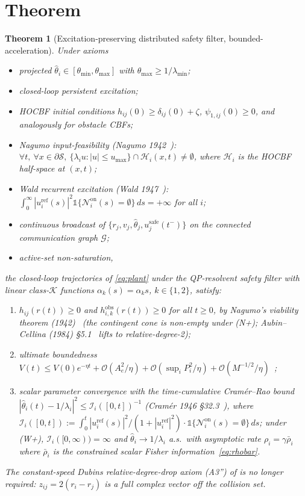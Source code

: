 \documentclass[letterpaper,10pt,conference]{IEEEtran}
\newcommand{\thmin}{\theta_{\min}}
\newcommand{\thmax}{\theta_{\max}}
\newcommand{\lammin}{\lambda_{\min}}
\newcommand{\thethat}{\hat\theta}
\newcommand{\rhobar}{\bar\rho}
\newtheorem{theorem}{Theorem}
\begin{document}
\section{Theorem}

\begin{theorem}[Excitation-preserving distributed safety filter, bounded-acceleration]
\label{thm:main}
Under axioms
\begin{itemize}
\item[(A1)] projected $\thethat_i \in [\thmin, \thmax]$ with $\thmax \ge 1/\lammin$;
\item[(A2)] closed-loop persistent excitation;
\item[(A3)] HOCBF initial conditions $h_{ij}(0) \ge \delta_{ij}(0) + \zeta$, $\psi_{1,ij}(0) \ge 0$, and analogously for obstacle CBFs;
\item[(N+)] \emph{Nagumo input-feasibility} (Nagumo 1942~\cite{nagumo1942}): $\forall t,\ \forall x \in \partial\mathcal{S},\ \{\lambda_i u : |u|\le u_{\max}\} \cap \mathcal{H}_i(x,t) \ne \emptyset$, where $\mathcal{H}_i$ is the HOCBF half-space at $(x,t)$;
\item[(W+)] \emph{Wald recurrent excitation} (Wald 1947~\cite{wald1947}): $\int_0^\infty |u_i^{\text{ref}}(s)|^2 \mathbb{1}\{\mathcal{N}_i^{\text{on}}(s)=\emptyset\}\,ds = +\infty$ for all $i$;
\item[(A4)] continuous broadcast of $\{r_j, v_j, \thethat_j, u_j^{\text{safe}}(t^-)\}$ on the connected communication graph $\mathcal{G}$;
\item[(A5)] active-set non-saturation,
\end{itemize}
the closed-loop trajectories of \eqref{eq:plant} under the QP-resolvent safety filter with linear class-$\mathcal{K}$ functions $\alpha_k(s) = \alpha_k s$, $k\in\{1,2\}$, satisfy:
\begin{enumerate}
\item[(1)] $h_{ij}(r(t)) \ge 0$ and $h_{i,k}^{\text{obs}}(r(t)) \ge 0$ for all $t \ge 0$, by Nagumo's viability theorem (1942)~\cite{nagumo1942} (the contingent cone is non-empty under (N+); Aubin--Cellina (1984) §5.1~\cite{aubinCellina1984} lifts to relative-degree-2);
\item[(2)] ultimate boundedness $V(t) \le V(0) e^{-\eta t} + \mathcal{O}(A_e^2/\eta) + \mathcal{O}(\sup_i P_i^2/\eta) + \mathcal{O}(M^{-1/2}/\eta)$~\cite{krasovskii1959};
\item[(3)] scalar parameter convergence with the time-cumulative Cram\'er--Rao bound $|\thethat_i(t) - 1/\lambda_i|^2 \le \mathcal{I}_i([0,t])^{-1}$ (Cram\'er 1946 §32.3~\cite{cramer1946}), where $\mathcal{I}_i([0,t]) := \int_0^t |u_i^{\text{ref}}(s)|^2/(1+|u_i^{\text{ref}}|^2) \cdot \mathbb{1}\{\mathcal{N}_i^{\text{on}}(s)=\emptyset\}\,ds$; under (W+), $\mathcal{I}_i([0,\infty)) = \infty$ and $\thethat_i \to 1/\lambda_i$ a.s.\ with asymptotic rate $\rho_i = \gamma\rhobar_i$ where $\rhobar_i$ is the constrained scalar Fisher information~\eqref{eq:rhobar}.
\end{enumerate}
The constant-speed Dubins relative-degree-drop axiom (A3'') of \cite{maldonadoAnnaswamy2025} is no longer required: $z_{ij} = 2(r_i - r_j)$ is a full complex vector off the collision set.
\end{theorem}
\end{document}
